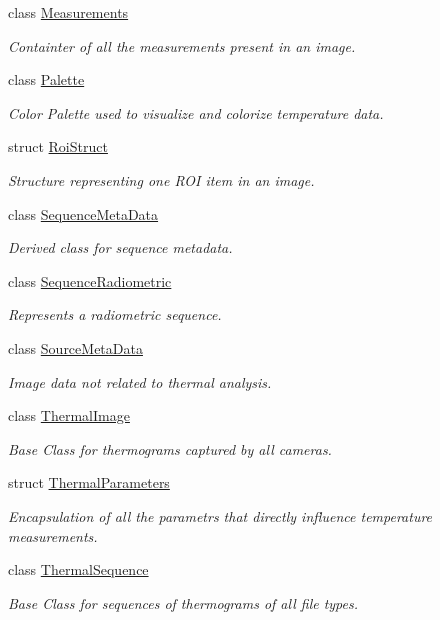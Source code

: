 \begin{DoxyCompactItemize}
class \hyperlink{classwtl_1_1_measurements}{Measurements}
\begin{DoxyCompactList}\small\item\em Containter of all the measurements present in an image. \end{DoxyCompactList}\item 
class \hyperlink{classwtl_1_1_palette}{Palette}
\begin{DoxyCompactList}\small\item\em Color Palette used to visualize and colorize temperature data. \end{DoxyCompactList}\item 
struct \hyperlink{structwtl_1_1_roi_struct}{Roi\+Struct}
\begin{DoxyCompactList}\small\item\em Structure representing one R\+OI item in an image. \end{DoxyCompactList}\item 
class \hyperlink{classwtl_1_1_sequence_meta_data}{Sequence\+Meta\+Data}
\begin{DoxyCompactList}\small\item\em Derived class for sequence metadata. \end{DoxyCompactList}\item 
class \hyperlink{classwtl_1_1_sequence_radiometric}{Sequence\+Radiometric}
\begin{DoxyCompactList}\small\item\em Represents a radiometric sequence. \end{DoxyCompactList}\item 
class \hyperlink{classwtl_1_1_source_meta_data}{Source\+Meta\+Data}
\begin{DoxyCompactList}\small\item\em Image data not related to thermal analysis. \end{DoxyCompactList}\item 
class \hyperlink{classwtl_1_1_thermal_image}{Thermal\+Image}
\begin{DoxyCompactList}\small\item\em Base Class for thermograms captured by all cameras. \end{DoxyCompactList}\item 
struct \hyperlink{structwtl_1_1_thermal_parameters}{Thermal\+Parameters}
\begin{DoxyCompactList}\small\item\em Encapsulation of all the parametrs that directly influence temperature measurements. \end{DoxyCompactList}\item 
class \hyperlink{classwtl_1_1_thermal_sequence}{Thermal\+Sequence}
\begin{DoxyCompactList}\small\item\em Base Class for sequences of thermograms of all file types. \end{DoxyCompactList}\end{DoxyCompactItemize}
